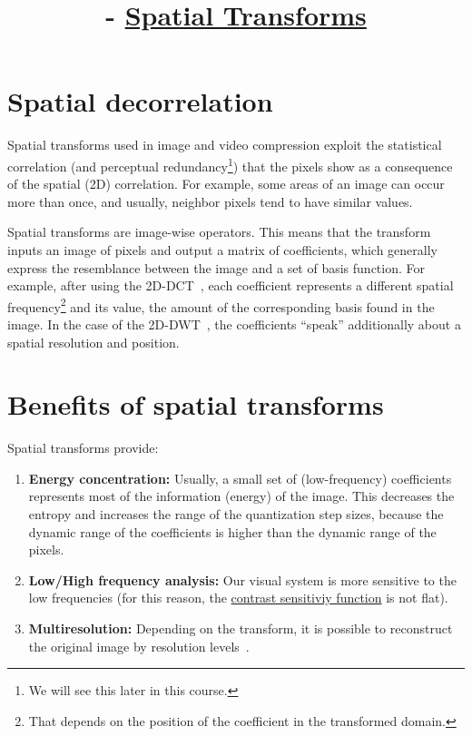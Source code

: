 
\title{\SM{} - \href{https://github.com/Sistemas-Multimedia/Sistemas-Multimedia.github.io/tree/master/contents/spatial_transforms}{Spatial Transforms}}

\maketitle

\tableofcontents

\section{Spatial decorrelation}

Spatial transforms used in image and video compression exploit the
statistical correlation (and perceptual redundancy\footnote{We will
see this later in this course.}) that the pixels show as a consequence
of the spatial (2D) correlation. For example, some areas of an image
can occur more than once, and usually, neighbor pixels tend to have
similar values.

Spatial transforms are image-wise operators. This means that the
transform inputs an image of pixels and output a matrix of
coefficients, which generally express the resemblance between the
image and a set of basis function. For example, after using the
2D-DCT~\cite{vruiz__DCT}, each coefficient represents a different spatial
frequency\footnote{That depends on the position of the coefficient in
  the transformed domain.} and its value, the amount of the
corresponding basis found in the image. In the case of the
2D-DWT~\cite{vruiz__DWT}, the coefficients ``speak'' additionally about a
spatial resolution and position.


\section{Benefits of spatial transforms}

Spatial transforms provide:
\begin{enumerate}
\item \textbf{Energy concentration:} Usually, a small set of
  (low-frequency) coefficients represents most of the information
  (energy) of the image. This decreases the entropy and increases the
  range of the quantization step sizes, because the dynamic range of
  the coefficients is higher than the dynamic range of the pixels.
\item \textbf{Low/High frequency analysis:} Our visual system is more
  sensitive to the low frequencies (for this reason, the
  \href{https://en.wikipedia.org/wiki/Contrast_(vision)#Contrast_sensitivity}{contrast
    sensitiviy function} is not flat).
\item \textbf{Multiresolution:} Depending on the transform, it is
  possible to reconstruct the original image by resolution
  levels~\cite{vruiz__DWT}.
\end{enumerate}

